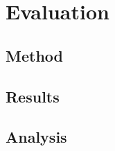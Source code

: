 \section{Evaluation} \label{Evaluation}

\subsection{Method}
\subsection{Results}
\subsection{Analysis}

